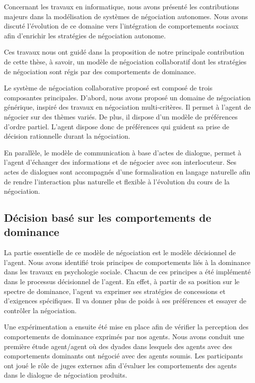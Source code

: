 	Concernant les travaux en informatique, nous avons présenté les contributions majeurs dans la modélisation de systèmes de négociation autonomes. Nous avons discuté l'évolution de ce domaine vers l'intégration de comportements sociaux afin d'enrichir les stratégies de négociation autonome. 
	
	
	Ces travaux nous ont guidé dans la proposition de notre principale contribution de cette thèse, à savoir, un modèle de négociation collaboratif dont les stratégies de négociation sont régis par des comportements de dominance.
	
	Le système de négociation collaborative proposé est composé de trois composantes principales.
	D'abord, nous avons proposé un domaine de négociation générique, inspiré des travaux en négociation multi-critères. Il permet à l'agent de négocier sur des thèmes variés. De plus, il dispose d'un modèle de préférences d'ordre partiel. L'agent dispose donc de préférences qui guident sa prise de décision rationnelle durant la négociation.
	
	En parallèle, le modèle de communication à base d'actes de dialogue, permet à l'agent d'échanger des informations et de négocier avec son interlocuteur. Ses actes de dialogues sont accompagnés d'une formalisation en langage naturelle afin de rendre l'interaction plus naturelle et flexible à l'évolution du cours de la négociation.
	
	\subsection{Décision basé sur les comportements de dominance}
	 
	 La partie essentielle de ce modèle de négociation est le modèle décisionnel de l'agent. Nous avons identifié trois principes de comportements liés à la dominance dans les travaux  en psychologie sociale. Chacun de ces principes a été implémenté dans le processus décisionnel de l'agent.
	 En effet, à partir de sa position sur le spectre de dominance, l'agent va exprimer ses stratégies de concessions et d'exigences spécifiques. Il va donner plus de poids à ses préférences et essayer de contrôler la négociation. 
	
	Une expérimentation a ensuite été mise en place afin de vérifier la perception des comportements de dominance exprimés par nos agents.
	Nous avons conduit une première étude agent/agent où des dyades dans lesquels des agents avec des comportements dominants ont négocié avec des agents soumis. Les participants ont joué le rôle de juges externes afin d'évaluer les comportements des agents dans le dialogue de négociation produits. 

